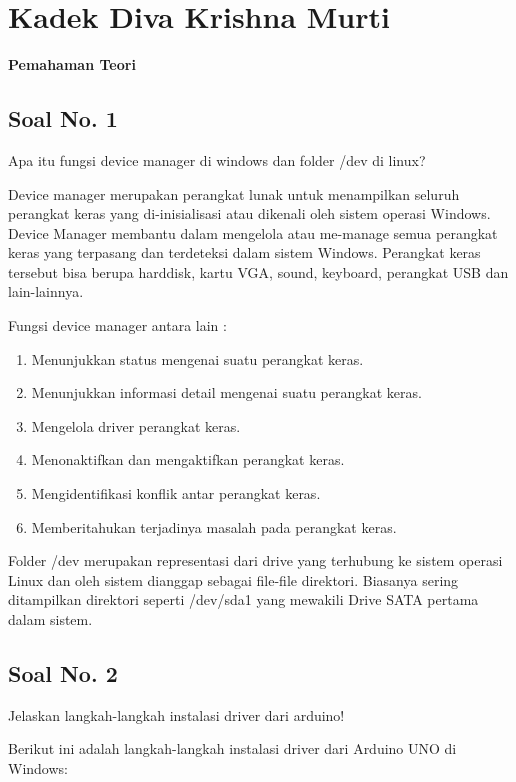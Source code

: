 \section{Kadek Diva Krishna Murti}
{\Large \textbf{Pemahaman Teori}}
\subsection{Soal No. 1}
Apa itu fungsi device manager di windows dan folder /dev di linux?

\hfill \break
Device manager merupakan perangkat lunak untuk menampilkan seluruh perangkat keras yang di-inisialisasi atau dikenali oleh sistem operasi Windows. Device Manager membantu dalam mengelola atau me-manage semua perangkat keras yang terpasang dan terdeteksi dalam sistem Windows. Perangkat keras tersebut bisa berupa harddisk, kartu VGA, sound, keyboard, perangkat USB dan lain-lainnya.

\hfill \break
Fungsi device manager antara lain :
\begin{enumerate}
	\item Menunjukkan status mengenai suatu perangkat keras.
	\item Menunjukkan informasi detail mengenai suatu perangkat keras.
	\item Mengelola driver perangkat keras.
	\item Menonaktifkan dan mengaktifkan perangkat keras.
	\item Mengidentifikasi konflik antar perangkat keras.
	\item Memberitahukan terjadinya masalah pada perangkat keras.
\end{enumerate}

\hfill \break
Folder /dev merupakan representasi dari drive yang terhubung ke sistem operasi Linux dan oleh sistem dianggap sebagai file-file direktori. Biasanya sering ditampilkan direktori seperti /dev/sda1 yang mewakili Drive SATA pertama dalam sistem.

\subsection{Soal No. 2}
Jelaskan langkah-langkah instalasi driver dari arduino!

\hfill \break
Berikut ini adalah langkah-langkah instalasi driver dari Arduino UNO di Windows:

